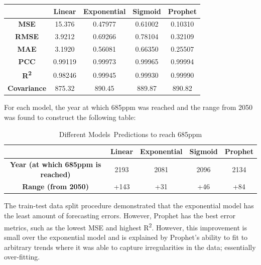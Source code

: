 \documentclass[12pt]{mcmthesis}
\begin{document}
    \begin{center}
        \begin{tabular}{ |c|c|c|c|c|}
            \hline
            & \textbf{Linear} & \textbf{Exponential} & \textbf{Sigmoid} & \textbf{Prophet} \\
            \hline
            \textbf{MSE}        & 15.376          & 0.47977              & 0.61002          & 0.10310          \\ \hline
            \textbf{RMSE}       & 3.9212          & 0.69266              & 0.78104          & 0.32109          \\ \hline
            \textbf{MAE}        & 3.1920          & 0.56081              & 0.66350          & 0.25507          \\ \hline
            \textbf{PCC}        & 0.99119         & 0.99973              & 0.99965          & 0.99994          \\ \hline
            \textbf{R\textsuperscript{2}}    & 0.98246         & 0.99945              & 0.99930          & 0.99990          \\ \hline
            \textbf{Covariance} & 875.32          & 890.45               & 889.87           & 890.82           \\ \hline
        \end{tabular}
    \end{center}

    For each model, the year at which 685ppm was reached and the range from 2050 was found to construct the following table:

    \begin{table}
        \centering
        \begin{tabular}{ |c|c|c|c|c|}
            \hline
            & \textbf{Linear} & \textbf{Exponential} & \textbf{Sigmoid} & \textbf{Prophet} \\
            \hline
            \textbf{Year (at which 685ppm is reached)} & 2193            & 2081                 & 2096             & 2134             \\
            \hline
            \textbf{Range (from 2050)}                 & +143            & +31                  & +46              & +84              \\
            \hline
        \end{tabular}
        \caption{Different Models\textquotesingle~Predictions to reach 685ppm}
        \label{tab:co2_685}
    \end{table}

    The train-test data split procedure demonstrated that the exponential model has the least amount of forecasting errors.
    However, Prophet has the best error metrics, such as the lowest MSE and highest R\textsuperscript{2}. However, this improvement is small over the exponential model and is explained by Prophet's ability to fit to arbitrary trends where it was able to capture irregularities in the data; essentially over-fitting.
\end{document}
